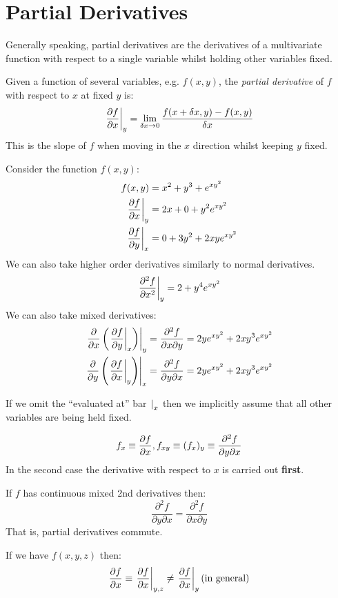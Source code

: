 \documentclass[../main.tex]{subfiles}
\begin{document}
\section{Partial Derivatives}
Generally speaking, partial derivatives are the derivatives of a multivariate function with respect to a single variable whilst holding other variables fixed.
\begin{definition}
  Given a function of several variables, e.g. $f(x, y)$, the \textit{partial derivative} of $f$ with respect to $x$ at fixed $y$ is:
  \[
    \at{\pderiv{f}{x}}{y} = \lim_{\delta x \to 0} \frac{f(x + \delta x, y) - f(x, y)}{\delta x}
  \]
  This is the slope of $f$ when moving in the $x$ direction whilst keeping $y$ fixed.
\end{definition}
\begin{example}
  Consider the function $f(x, y)$:
  \begin{align*}
    f(x, y) &= x^2 + y^3 + e^{xy^2} \\
    \at{\pderiv{f}{x}}{y} &= 2x+0+y^2e^{xy^2} \\
    \at{\pderiv{f}{y}}{x} &= 0 + 3y^2 + 2xye^{xy^2}
  \end{align*}
  We can also take higher order derivatives similarly to normal derivatives.
  \[
    \at{\pderiv[2]{f}{x}}{y} = 2 +y^4e^{xy^2}
  \]
  We can also take mixed derivatives:
  \begin{align*}
    \at{\pderiv{}{x}\left(\at{\pderiv{f}{y}}{x}\right)}{y} &= \frac{\partial^2 f}{\partial x \partial y} =2ye^{xy^2} + 2xy^3 e^{xy^2} \\
    \at{\pderiv{}{y}\left(\at{\pderiv{f}{x}}{y}\right)}{x} &= \frac{\partial^2 f}{\partial y \partial x} =2ye^{xy^2} + 2xy^3 e^{xy^2}
  \end{align*}
\end{example}
\begin{remark}[Notation]
  If we omit the ``evaluated at'' bar $\left.  \right|_{x}$ then we implicitly assume that all other variables are being held fixed.
\end{remark}
\begin{remark}
  \[
    f_x \equiv \pderiv{f}{x}, f_{xy} \equiv (f_x)_y \equiv \frac{\partial^2 f}{\partial y \partial x}
  \]
  In the second case the derivative with respect to $x$ is carried out \textbf{first}.
\end{remark}
\begin{theorem}
  If $f$ has continuous mixed 2nd derivatives then:
  \[
    \frac{\partial^2 f}{\partial y \partial x} = \frac{\partial^2 f}{\partial x \partial y}
  \]
  That is, partial derivatives commute.
\end{theorem}
\begin{remark}
  If we have $f(x, y, z)$ then:
  \[
    \pderiv{f}{x} \equiv \at{\pderiv{f}{x}}{y, z} \neq \at{\pderiv{f}{x}}{y} \text{(in general)}
  \]
\end{remark}
\end{document}
